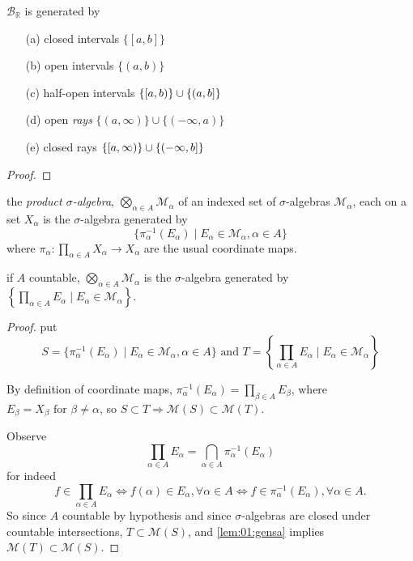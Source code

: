 \begin{prop}\label{prop:1.2}\label{prop:01:borelrealsgen}
  $\mathcal{B}_{\mathbb{R}}$ is generated by
  \begin{itemize}
  \item[(a)] closed intervals ${\{[a, b]\}}$
  \item[(b)] open intervals ${\{(a, b)\}}$
  \item[(c)] half-open intervals
    ${\{[a,b)\}\cup\{(a,b]\}}$
  \item[(d)] open \emph{rays}
    ${\{(a,\infty)\}\cup\{(-\infty,a)\}}$
  \item[(e)] closed rays
    ${\{[a,\infty)\}\cup\{(-\infty,b]\}}$
  \end{itemize}
\end{prop}
\begin{proof}
\end{proof}

\begin{defn}
  the \emph{product $\sigma$-algebra},
  ${\bigotimes_{\alpha\in A} \mathcal{M}_\alpha}$
  of an indexed set of $\sigma$-algebras ${\mathcal{M}_\alpha}$,
  each on a set $X_\alpha$ is the $\sigma$-algebra generated by
  \[
  \{\pi_\alpha^{-1}(E_\alpha)\mid E_\alpha\in\mathcal{M}_\alpha, \alpha\in A\}
  \]
  where ${\pi_\alpha: \prod_{\alpha\in A} X_\alpha\rightarrow X_\alpha}$
  are the usual coordinate maps.
\end{defn}

\begin{prop}\label{prop:1.3}\label{prop:01:prodsachar}
  if $A$ countable, ${\bigotimes_{\alpha\in A} \mathcal{M}_\alpha}$
  is the $\sigma$-algebra generated by
  ${\left\{\prod_{\alpha\in A} E_\alpha\mid E_\alpha\in\mathcal{M}_\alpha\right\}}$.
\end{prop}
\begin{proof}
  put
  \[
  S=
  \{\pi_\alpha^{-1}(E_\alpha)\mid E_\alpha\in\mathcal{M}_\alpha, \alpha\in A\}
  \text{ and }
  T=
  \left\{\prod_{\alpha\in A} E_\alpha\mid E_\alpha\in\mathcal{M}_\alpha \right\}
  \]

  By definition of coordinate maps,
  ${\pi_\alpha^{-1}(E_\alpha)=\prod_{\beta\in A} E_\beta}$,
  where ${E_\beta=X_\beta \text{ for }\beta\neq\alpha}$,
  so ${S\subset T \Rightarrow \mathcal{M}(S)\subset\mathcal{M}(T)}$.

  Observe
  \[
  \prod_{\alpha\in A} E_\alpha = \bigcap_{\alpha\in A} \pi_\alpha^{-1}(E_\alpha)
  \]
  for indeed
  \[
  f\in \prod_{\alpha\in A} E_\alpha \iff
  f(\alpha)\in E_\alpha, \forall \alpha\in A \iff
  f\in\pi_\alpha^{-1}(E_\alpha), \forall \alpha\in A.
  \]
  So since $A$ countable by hypothesis and since
  $\sigma$-algebras are closed under countable intersections,
  ${T\subset\mathcal{M}(S)}$, and \ref{lem:01:gensa}
  implies ${\mathcal{M}(T)\subset\mathcal{M}(S)}$.
\end{proof}

